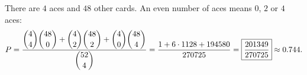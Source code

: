 There are $4$ aces and $48$ other cards. An even number of aces means $0$, $2$ or $4$ aces:
\[P=\dfrac{\dbinom44\dbinom{48}0+\dbinom42\dbinom{48}2+\dbinom40\dbinom{48}4}{\dbinom{52}4}=\dfrac{1+6\cdot1128+194580}{270725}=\boxed{\dfrac{201349}{270725}}\approx0.744.\]
